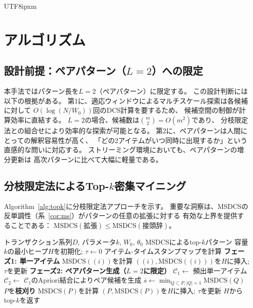 \documentclass[conference]{IEEEtran}
\begin{document}
\begin{CJK}{UTF8}{ipxm}
\section{アルゴリズム}\label{sec:algorithm}

\subsection{設計前提：ペアパターン（$L{=}2$）への限定}

本手法ではパターン長を$L{=}2$（ペアパターン）に限定する。
この設計判断には以下の根拠がある。
第1に、適応ウィンドウによるマルチスケール探索は各候補に対して
$O(\log(N/W_0))$回のDCS計算を要するため、
候補空間の制御が計算効率に直結する。
$L{=}2$の場合、候補数は$\binom{m}{2} = O(m^2)$であり、
分枝限定法との組合せにより効率的な探索が可能となる。
第2に、ペアパターンは人間にとっての解釈容易性が高く、
「どの2アイテムがいつ同時に出現するか」という直感的な問いに対応する。
ストリーミング環境においても、ペアパターンの増分更新は
高次パターンに比べて大幅に軽量である。

\subsection{分枝限定法によるTop-$k$密集マイニング}

Algorithm~\ref{alg:topk}に分枝限定法アプローチを示す。
重要な洞察は、MSDCSの反単調性（系~\ref{cor:ms}）がパターンの任意の拡張に対する
有効な上界を提供することである：
$\mathrm{MSDCS}(\text{拡張}) \leq \mathrm{MSDCS}(\text{接頭辞})$。

\begin{algorithm}[t]
\caption{Top-$k$密集パターンマイニング}\label{alg:topk}
\begin{algorithmic}[1]
\REQUIRE トランザクション系列$D$, パラメータ$k$, $W_0$, $\theta_0$
\ENSURE MSDCSによるtop-$k$パターン
\STATE 容量$k$の最小ヒープ$H$を初期化; $\tau \leftarrow 0$
\STATE アイテム-タイムスタンプマップを計算
\STATE \textbf{フェーズ1: 単一アイテム}
  \STATE $\mathrm{MSDCS}((i))$を計算
  \STATE $((i), \mathrm{MSDCS}((i)))$を$H$に挿入; $\tau$を更新
\ENDFOR
\STATE \textbf{フェーズ2: ペアパターン生成（$L{=}2$に限定）}
\STATE $\mathcal{C}_1 \leftarrow$ 頻出単一アイテム
\STATE $\mathcal{C}_2 \leftarrow$ $\mathcal{C}_1$のApriori結合によりペア候補を生成
  \STATE $\overline{s} \leftarrow \min_{Q \subset P, |Q|=1} \mathrm{MSDCS}(Q)$
    \STATE $P$を\textbf{枝刈り}
  \ELSE
    \STATE $\mathrm{MSDCS}(P)$を計算
    \STATE $(P, \mathrm{MSDCS}(P))$を$H$に挿入; $\tau$を更新
  \ENDIF
\ENDFOR
\RETURN $H$からtop-$k$を返す
\end{algorithmic}
\end{algorithm}


\end{CJK}
\end{document}
